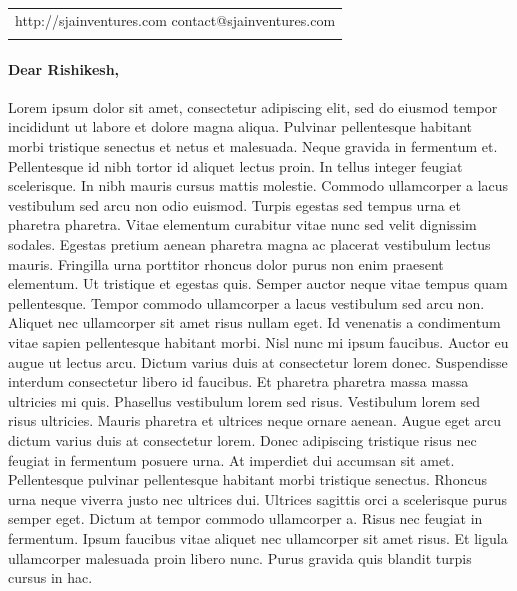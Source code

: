 \documentclass[a4paper]{article}%
\begin{document}
%
\normalsize%
\begin{tabu}{X[r]}%
\begin{minipage}[t!]{0.49\textwidth}%
\flushright%
http://sjainventures.com%
\linebreak%
contact@sjainventures.com%
\end{minipage}\\%
\\%
\end{tabu}%
\pagestyle{firstpage}%
\paragraph{Dear Rishikesh,}%
\label{para:Dear Rishikesh,}%
Lorem ipsum dolor sit amet, consectetur adipiscing elit, sed do eiusmod tempor incididunt ut labore et dolore magna aliqua. Pulvinar pellentesque habitant morbi tristique senectus et netus et malesuada. Neque gravida in fermentum et. Pellentesque id nibh tortor id aliquet lectus proin. In tellus integer feugiat scelerisque. In nibh mauris cursus mattis molestie. Commodo ullamcorper a lacus vestibulum sed arcu non odio euismod. Turpis egestas sed tempus urna et pharetra pharetra. Vitae elementum curabitur vitae nunc sed velit dignissim sodales. Egestas pretium aenean pharetra magna ac placerat vestibulum lectus mauris. Fringilla urna porttitor rhoncus dolor purus non enim praesent elementum. Ut tristique et egestas quis.\newline%
\newline%
Semper auctor neque vitae tempus quam pellentesque. Tempor commodo ullamcorper a lacus vestibulum sed arcu non. Aliquet nec ullamcorper sit amet risus nullam eget. Id venenatis a condimentum vitae sapien pellentesque habitant morbi. Nisl nunc mi ipsum faucibus. Auctor eu augue ut lectus arcu. Dictum varius duis at consectetur lorem donec. Suspendisse interdum consectetur libero id faucibus. Et pharetra pharetra massa massa ultricies mi quis. Phasellus vestibulum lorem sed risus.\newline%
\newline%
Vestibulum lorem sed risus ultricies. Mauris pharetra et ultrices neque ornare aenean. Augue eget arcu dictum varius duis at consectetur lorem. Donec adipiscing tristique risus nec feugiat in fermentum posuere urna. At imperdiet dui accumsan sit amet. Pellentesque pulvinar pellentesque habitant morbi tristique senectus. Rhoncus urna neque viverra justo nec ultrices dui. Ultrices sagittis orci a scelerisque purus semper eget. Dictum at tempor commodo ullamcorper a. Risus nec feugiat in fermentum. Ipsum faucibus vitae aliquet nec ullamcorper sit amet risus. Et ligula ullamcorper malesuada proin libero nunc. Purus gravida quis blandit turpis cursus in hac.\newline%
\end{document}
